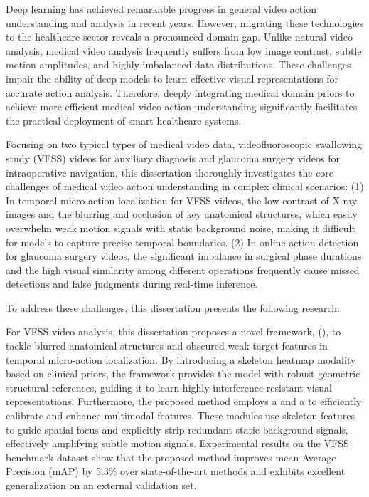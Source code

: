 \begin{abstractEN}
Deep learning has achieved remarkable progress in general video action understanding and analysis in recent years.
However, migrating these technologies to the healthcare sector reveals a pronounced domain gap.
Unlike natural video analysis, medical video analysis frequently suffers from low image contrast, subtle motion amplitudes, and highly imbalanced data distributions. 
These challenges impair the ability of deep models to learn effective visual representations for accurate action analysis.
Therefore, deeply integrating medical domain priors to achieve more efficient medical video action understanding significantly 
facilitates the practical deployment of smart healthcare systems.

Focusing on two typical types of medical video data, 
videofluoroscopic swallowing study (VFSS) videos for auxiliary diagnosis and glaucoma surgery videos 
for intraoperative navigation, 
this dissertation thoroughly investigates the core challenges of medical video action understanding in complex clinical scenarios:
(1) In temporal micro-action localization for VFSS videos, 
the low contrast of X-ray images and the blurring and occlusion of key anatomical structures,
which easily overwhelm weak motion signals with static background noise,
making it difficult for models to capture precise temporal boundaries.
(2) In online action detection for glaucoma surgery videos, 
the significant imbalance in surgical phase durations and the high visual similarity 
among different operations frequently cause missed detections and false judgments during real-time inference.

To address these challenges, this dissertation presents the following research:

For VFSS video analysis, this dissertation proposes a novel framework, \fullnameen (\sexyname), 
to tackle blurred anatomical structures and obscured weak target features in temporal micro-action localization.
By introducing a skeleton heatmap modality based on clinical priors, 
the framework provides the model with robust geometric structural references, 
guiding it to learn highly interference-resistant visual representations.
Furthermore, the proposed method employs a \crossblockfullen 
and a \channelblockfullen to efficiently calibrate and enhance multimodal features.
These modules use skeleton features to guide spatial focus and explicitly strip redundant static background signals, 
effectively amplifying subtle motion signals.
Experimental results on the VFSS benchmark dataset show that 
the proposed method improves mean Average Precision (mAP) by 5.3\% over state-of-the-art methods 
and exhibits excellent generalization on an external validation set.


\end{abstractEN}
